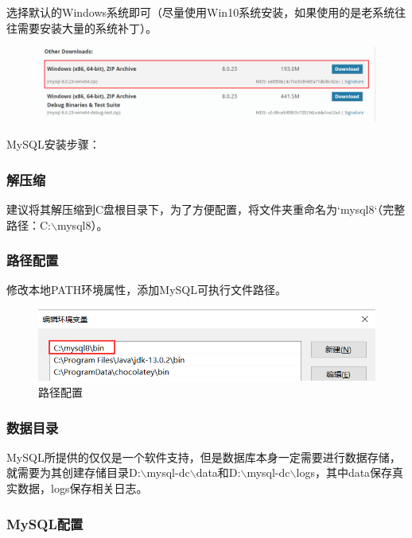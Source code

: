 \documentclass[12pt, openany, oneside]{book}
\begin{document}
选择默认的Windows系统即可（尽量使用Win10系统安装，如果使用的是老系统往往需要安装大量的系统补丁）。\\

\begin{figure}[H]
	\centering
	\includegraphics[scale=0.5]{img/C2/2.png}
\end{figure}

MySQL安装步骤：

\subsubsection{解压缩}

建议将其解压缩到C盘根目录下，为了方便配置，将文件夹重命名为`mysql8`（完整路径：C:$ \backslash $mysql8）。

\subsubsection{路径配置}

修改本地PATH环境属性，添加MySQL可执行文件路径。\\

\begin{figure}[H]
	\centering
	\includegraphics[]{img/C2/3.png}
	\caption{路径配置}
\end{figure}

\subsubsection{数据目录}

MySQL所提供的仅仅是一个软件支持，但是数据库本身一定需要进行数据存储，就需要为其创建存储目录D:$ \backslash $mysql-dc$ \backslash $data和D:$ \backslash $mysql-dc$ \backslash $logs，其中data保存真实数据，logs保存相关日志。

\subsubsection{MySQL配置}
\end{document}
